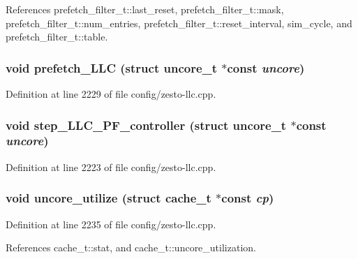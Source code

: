 References prefetch\_\-filter\_\-t::last\_\-reset, prefetch\_\-filter\_\-t::mask, prefetch\_\-filter\_\-t::num\_\-entries, prefetch\_\-filter\_\-t::reset\_\-interval, sim\_\-cycle, and prefetch\_\-filter\_\-t::table.
\subsubsection[{prefetch\_\-LLC}]{\setlength{\rightskip}{0pt plus 5cm}void prefetch\_\-LLC (struct {\bf uncore\_\-t} $\ast$const  {\em uncore})}\label{config_2zesto-llc_8cpp_8ed5f90d7b07bddefbf6736b13da8eb2}




Definition at line 2229 of file config/zesto-llc.cpp.
\subsubsection[{step\_\-LLC\_\-PF\_\-controller}]{\setlength{\rightskip}{0pt plus 5cm}void step\_\-LLC\_\-PF\_\-controller (struct {\bf uncore\_\-t} $\ast$const  {\em uncore})}\label{config_2zesto-llc_8cpp_65086cfd5f54ff7a76a41587c8f6a01e}




Definition at line 2223 of file config/zesto-llc.cpp.
\subsubsection[{uncore\_\-utilize}]{\setlength{\rightskip}{0pt plus 5cm}void uncore\_\-utilize (struct {\bf cache\_\-t} $\ast$const  {\em cp})}\label{config_2zesto-llc_8cpp_d129e662a0b491f13301bf6f96bdcb8b}




Definition at line 2235 of file config/zesto-llc.cpp.

References cache\_\-t::stat, and cache\_\-t::uncore\_\-utilization.
